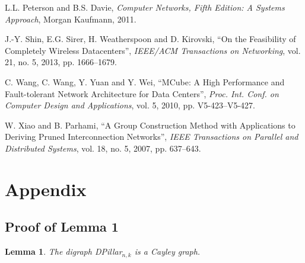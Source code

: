\documentclass{article}
\newcounter{fig}
\newtheorem{lemma}[definition]{Lemma}
\begin{document}
\begin{thebibliography}{99}
 L.L. Peterson and B.S. Davie, \emph{Computer Networks, Fifth Edition\/\emph{:} A Systems Approach},
 Morgan Kaufmann, 2011.



 J.-Y. Shin, E.G. Sirer, H. Weatherspoon and D. Kirovski, ``On the Feasibility of Completely Wireless Datacenters'',  \emph{IEEE/ACM Transactions on Networking}, vol. 21, no. 5, 2013, pp. 1666--1679.



 C. Wang, C. Wang, Y. Yuan and Y. Wei, ``MCube: A High Performance and Fault-tolerant Network Architecture for Data Centers'', \emph{Proc. Int. Conf. on Computer Design and Applications}, vol. 5, 2010, pp. V5-423--V5-427.

 W. Xiao and B. Parhami, ``A Group Construction Method with Applications to Deriving Pruned Interconnection Networks'', \emph{IEEE Transactions on Parallel and Distributed Systems}, vol. 18, no. 5, 2007, pp. 637--643.




\end{thebibliography}

\appendix
\renewcommand{\thesection}{A}\setcounter{figure}{0} \renewcommand{\thefigure}{A.\arabic{figure}}
\setcounter{table}{0} \renewcommand{\thetable}{A.\arabic{table}}

\section*{Appendix}
\subsection{Proof of Lemma 1}

\begin{lemma}
The digraph DPillar$_{n,k}$ is a Cayley graph.
\end{lemma}
\end{document}
